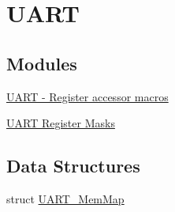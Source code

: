 \hypertarget{group___u_a_r_t___peripheral}{}\section{U\+A\+R\+T}
\label{group___u_a_r_t___peripheral}
\subsection*{Modules}
\begin{DoxyCompactItemize}
\item 
\hyperlink{group___u_a_r_t___register___accessor___macros}{U\+A\+R\+T -\/ Register accessor macros}
\item 
\hyperlink{group___u_a_r_t___register___masks}{U\+A\+R\+T Register Masks}
\end{DoxyCompactItemize}
\subsection*{Data Structures}
\begin{DoxyCompactItemize}
\item 
struct \hyperlink{struct_u_a_r_t___mem_map}{U\+A\+R\+T\+\_\+\+Mem\+Map}
\end{DoxyCompactItemize}
